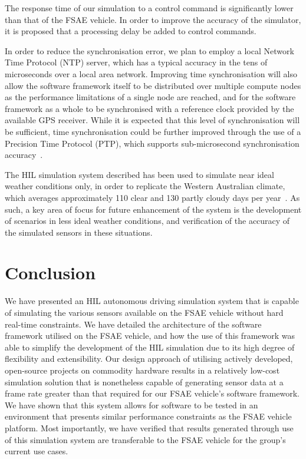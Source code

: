 The response time of our simulation to a control command is significantly lower than that of the FSAE vehicle.
In order to improve the accuracy of the simulator, it is proposed that a processing delay be added to control commands.

In order to reduce the synchronisation error, we plan to employ a local Network Time Protocol (NTP) server, which has a typical accuracy in the tens of microseconds over a local area network.
Improving time synchronisation will also allow the software framework itself to be distributed over multiple compute nodes as the performance limitations of a single node are reached, and for the software framework as a whole to be synchronised with a reference clock provided by the available GPS receiver.
While it is expected that this level of synchronisation will be sufficient, time synchronisation could be further improved through the use of a Precision Time Protocol (PTP), which supports sub-microsecond synchronisation accuracy~\cite{noauthor_ieee_2008}.


The HIL simulation system described has been used to simulate near ideal weather conditions only, in order to replicate the Western Australian climate, which averages approximately 110 clear and 130 partly cloudy days per year~\cite{bureau_of_meteorology_climate_2013}.
As such, a key area of focus for future enhancement of the system is the development of scenarios in less ideal weather conditions, and verification of the accuracy of the simulated sensors in these situations.

\section{Conclusion} \label{sec:8:conclusion}
We have presented an HIL autonomous driving simulation system that is capable of simulating the various sensors available on the FSAE vehicle without hard real-time constraints.
We have detailed the architecture of the software framework utilised on the FSAE vehicle, and how the use of this framework was able to simplify the development of the HIL simulation due to its high degree of flexibility and extensibility.
Our design approach of utilising actively developed, open-source projects on commodity hardware results in a relatively low-cost simulation solution that is nonetheless capable of generating sensor data at a frame rate greater than that required for our FSAE vehicle's software framework.
We have shown that this system allows for software to be tested in an environment that presents similar performance constraints as the FSAE vehicle platform.
Most importantly, we have verified that results generated through use of this simulation system are transferable to the FSAE vehicle for the group's current use cases.
